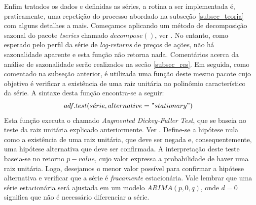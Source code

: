 \documentclass[12pt]{article}
\begin{document}
Enfim tratados os dados e definidas as séries, a rotina a ser implementada é, praticamente, uma repetição do processo abordado na subseção \ref{subsec_teoria} com alguns detalhes a mais. Começamos aplicando um método de decomposição sazonal do pacote \emph{tseries} chamado $ decompose() $, ver \cite{CRANR}. No entanto, como esperado pelo perfil da série de \textit{log-returns} de preços de ações, não há sazonalidade aparente e esta função não retorna nada. Comentários acerca da análise de sazonalidade serão realizados na secão \ref{subsec_res}. Em seguida, como comentado na subseção anterior, é utilizada uma função deste mesmo pacote cujo objetivo é verificar a existência de uma raiz unitária no polinômio característico da série. A sintaxe desta função encontra-se a seguir:
\begin{equation*}\label{eq:adf}
adf.test(s\acute{e}rie, alternative = "stationary")
\end{equation*}
Esta função executa o chamado \emph{Augmented Dickey-Fuller Test}, que se baseia no teste da raiz unitária explicado anteriormente. Ver \cite{Tsay}. Define-se a hipótese nula como a existência de uma raiz unitária, que deve ser negada e, consequentemente, uma hipótese alternativa que deve ser confirmada. A interpretação deste teste baseia-se no retorno $ p-value $, cujo valor expressa a probabilidade de haver uma raiz unitária. Logo, desejamos o menor valor possível para confirmar a hipótese alternativa e verificar que a série é \textit{fracamente} estacionária. Vale lembrar que uma série estacionária será ajustada em um modelo $ARIMA(p,0,q)$, onde $d=0$ significa que não é necessário diferenciar a série.
\end{document}
